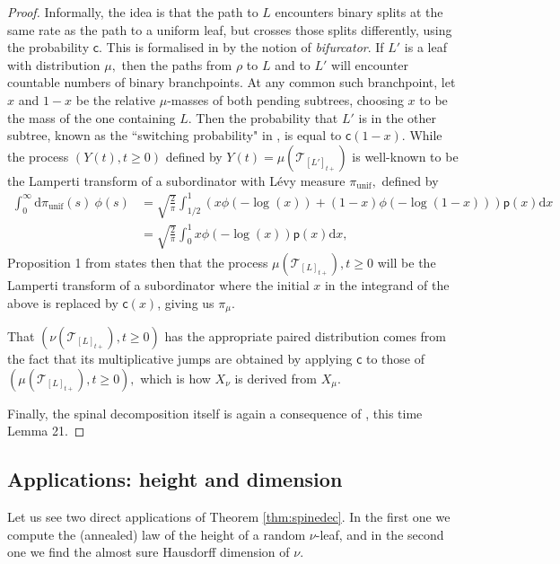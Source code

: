 \documentclass[11pt]{article}
\newcommand{\pp}{\mathsf{p}}
\newcommand{\cc}{\mathsf{c}}
\newcommand{\ff}{\cc}
\newcommand{\T}{\mathcal{T}}
\renewcommand{\geq}{\geqslant}
\newcommand{\dd}{\mathrm{d}}
\begin{document}
\begin{proof}
Informally, the idea is that the path to $L$ encounters binary splits at the same rate as the path to a uniform leaf, but crosses those splits differently, using the probability $\ff.$ This is formalised in \cite{PitmanWinkel2013} by the notion of \emph{bifurcator}. If $L'$ is a leaf with distribution $\mu,$ then the paths from $\rho$ to $L$ and to $L'$ will encounter countable numbers of binary branchpoints. At any common such branchpoint, let $x$ and $1-x$ be the relative $\mu$-masses of both pending subtrees, choosing $x$ to be the mass of the one containing $L$. Then the probability that $L'$ is in the other subtree, known as the ``switching probability" in \cite{PitmanWinkel2013}, is equal to $\ff(1-x)$. While the process $(Y(t),t\geq 0)$ defined by $Y(t)=\mu(\T_{[L']_{t+}})$ is well-known \cite[Section 4]{bertoin2002self} to be the Lamperti transform of a subordinator with L\'evy measure $\pi_{\mathrm{unif}},$  defined by
\begin{align*}
\int_{0}^{\infty} \mathrm{d} \pi_{\mathrm{unif}}(s) \  \phi(s) &= \sqrt{\frac{2}{\pi}} \int_{1/2}^{1} \left(x \phi(-\log (x)) + (1-x) \phi(-\log (1-x))\right)\pp(x)\dd x \\
&= \sqrt{\frac{2}{\pi}} \int_0^{1}  x \phi(-\log (x))\pp(x)\dd x,
\end{align*}
Proposition 1 from \cite{PitmanWinkel2013} states then that the process $\mu(\T_{[L]_{t+}}),t\geq 0$ will be the Lamperti transform of a subordinator where the initial $x$ in the integrand of the above is replaced by $\ff(x)$, giving us $\pi_\mu.$

That $(\nu(\T_{[L]_{t+}}),t\geq 0)$ has the appropriate paired distribution comes from the fact that its multiplicative jumps are obtained by applying $\ff$ to those of $(\mu(\T_{[L]_{t+}}),t\geq 0),$ which is how $X_{\nu}$ is derived from $X_{\mu}.$

Finally, the spinal decomposition itself is again a consequence of \cite{PitmanWinkel2013}, this time Lemma 21.
\end{proof}
\subsection{Applications: height and dimension}

Let us see two direct applications of Theorem \ref{thm:spinedec}. In the first one we compute the (annealed) law of the height of a random $\nu$-leaf, and in the second one we find the almost sure Hausdorff dimension of $\nu$.
\end{document}
